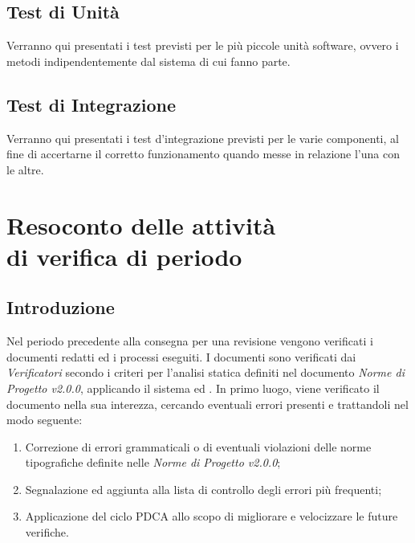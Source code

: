 \documentclass[openany,12pt,a4paper]{report}
\begin{document}
\section{Test di Unità}

Verranno qui presentati i test previsti per le più piccole unità software, ovvero i metodi indipendentemente dal sistema di cui fanno parte.

\section{Test di Integrazione}

Verranno qui presentati i test d'integrazione previsti per le varie componenti, al fine di accertarne il corretto funzionamento quando messe in relazione l'una con le altre.


\chapter{Resoconto delle attività \\ di verifica di periodo}

\section{Introduzione}

Nel periodo precedente alla consegna per una revisione vengono verificati i documenti redatti ed i processi eseguiti. I documenti sono verificati dai \textit{Verificatori} secondo i criteri per l'analisi statica definiti nel documento \textit{Norme di Progetto v2.0.0}, applicando il sistema  ed . In primo luogo, viene verificato il documento nella sua interezza, cercando eventuali errori presenti e trattandoli nel modo seguente:

\begin{enumerate}
	\item Correzione di errori grammaticali o di eventuali violazioni delle norme tipografiche definite nelle \textit{Norme di Progetto v2.0.0};
	\item Segnalazione ed aggiunta alla lista di controllo degli errori più frequenti;
	\item Applicazione del ciclo PDCA allo scopo di migliorare e velocizzare le future verifiche.
\end{enumerate}
\end{document}
